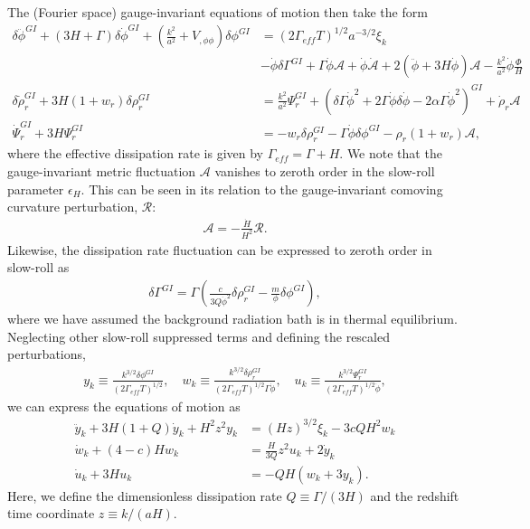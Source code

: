 The (Fourier space) gauge-invariant equations of motion then take the form
\begin{align}
    \delta\ddot\phi^{GI} + (3H+\Gamma)\delta\dot\phi^{GI} + \left( \frac{k^2}{a^2} + V_{,\phi\phi} \right)\delta\phi^{GI}
    &= (2\Gamma_{eff}T)^{1/2}a^{-3/2}\xi_k\\
    &- \dot\phi\delta\Gamma^{GI} + \Gamma\dot\phi\mathcal{A} + \dot\phi\dot{\mathcal{A}} + 2(\ddot\phi + 3H\dot\phi)\mathcal{A} - \frac{k^2}{a^2}\dot\phi\frac{\Phi}{H}\\
    \delta\dot\rho_r^{GI} + 3H(1+w_r)\delta\rho_r^{GI}
    &= \frac{k^2}{a^2}\Psi_r^{GI} + (\delta\Gamma\dot\phi^2 + 2\Gamma\dot\phi\delta\dot\phi - 2\alpha\Gamma\dot\phi^2)^{GI} + \dot\rho_r \mathcal{A}\\
    \dot\Psi_r^{GI} + 3H\Psi_r^{GI}
    &= -w_r \delta\rho_r^{GI} - \Gamma\dot\phi\delta\phi^{GI} - \rho_r (1+w_r)\mathcal{A},
\end{align}
where the effective dissipation rate is given by $\Gamma_{eff} = \Gamma + H$. We note that the gauge-invariant metric fluctuation $\mathcal{A}$ vanishes to zeroth order in the slow-roll parameter $\epsilon_H$. This can be seen in its relation to the gauge-invariant comoving curvature perturbation, $\mathcal{R}$:
\begin{align}
    \mathcal{A} = -\frac{\dot H}{H^2}\mathcal{R}.
\end{align}
Likewise, the dissipation rate fluctuation can be expressed to zeroth order in slow-roll as
\begin{align}
    \delta\Gamma^{GI} = \Gamma\left( \frac{c}{3Q\dot\phi^2}\delta\rho_r^{GI} - \frac{m}{\phi}\delta\phi^{GI} \right),
\end{align}
where we have assumed the background radiation bath is in thermal equilibrium. Neglecting other slow-roll suppressed terms and defining the rescaled perturbations,
\begin{align}
    y_k \equiv \frac{k^{3/2}\delta\phi^{GI}}{(2\Gamma_{eff}T)^{1/2}}, \quad w_k \equiv \frac{k^{3/2}\delta\rho_r^{GI}}{(2\Gamma_{eff}T)^{1/2}\Gamma\dot\phi}, \quad u_k \equiv \frac{k^{3/2}\Psi_r^{GI}}{(2\Gamma_{eff}T)^{1/2}\dot\phi},
\end{align}
we can express the equations of motion as
\begin{align}
    \ddot y_k + 3H(1+Q)\dot y_k + H^2 z^2 y_k &= (Hz) ^{3/2}\xi_k - 3cQH^2 w_k\\
    \dot w_k + (4-c)H w_k &= \frac{H}{3Q}z^2 u_k + 2\dot y_k\\
    \dot u_k + 3H u_k &= -QH(w_k + 3y_k).
\end{align}
Here, we define the dimensionless dissipation rate $Q \equiv \Gamma/(3H)$ and the redshift time coordinate $z \equiv k/(aH)$. 


